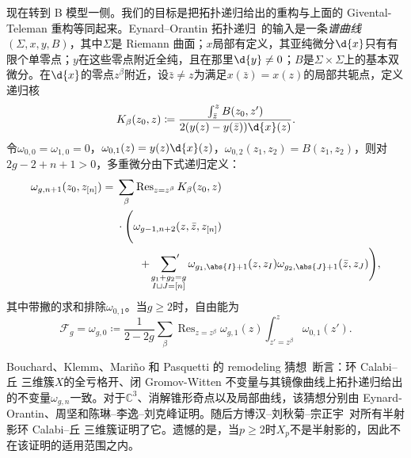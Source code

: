 \documentclass{amsart}
\theoremstyle{definition}
\theoremstyle{remark}
\theoremstyle{plain}
\theoremstyle{definition}
\theoremstyle{remark}
\newcommand{\C}{\mathbb{C}}
\newcommand{\mc}[1]{\mathcal{#1}}
\newcommand{\on}[1]{\operatorname{#1}}
\newcommand{\1}{\mathbf{1}}
\newcommand{\2}{\mathbf{2}}
\newcommand{\3}{\mathbf{3}}
\begin{document}
现在转到 B 模型一侧。我们的目标是把拓扑递归给出的重构与上面的 Givental-Teleman 重构等同起来。Eynard--Orantin 拓扑递归~\cite{EO2007}的输入是一条\textit{谱曲线}\((\Sigma,x,y,B)\)，其中\(\Sigma\)是 Riemann 曲面；\(x\)局部有定义，其亚纯微分\(\d{x}\)只有有限个单零点；\(y\)在这些零点附近全纯，且在那里\(\d{y} \neq 0\)；\(B\)是\(\Sigma \times \Sigma\)上的基本双微分。在\(\d{x}\)的零点\(z^{\beta}\)附近，设\(\bar{z} \neq z\)为满足\(x(\bar{z}) = x(z)\)的局部共轭点，定义递归核
\[ K_{\beta}(z_0,z) \coloneqq \frac{\int_{\bar{z}}^z B(z_0,z')}{2(y(z)-y(\bar{z}))\d{x}(z)}. \]
令\(\omega_{0,0} = \omega_{1,0} = 0\)，\(\omega_{0,1}(z) = y(z)\d{x}(z)\)，\(\omega_{0,2}(z_1,z_2) = B(z_1,z_2)\)，则对\(2g-2+n+1 > 0\)，多重微分由下式递归定义：
\begin{align*}
    \omega_{g,n+1}(z_0,z_{[n]}) ={}& \sum_{\beta}\on{Res}_{z = z^{\beta}} K_{\beta}(z_0,z) \\
    &\cdot \Bigg( \omega_{g-1,n+2}(z,\bar{z},z_{[n]}) \\
    &\qquad + \sideset{}{'}\sum_{\substack{g_1+g_2 = g \\ I \sqcup J = [n]}}\omega_{g_1,\abs{I}+1}(z,z_I)\omega_{g_2,\abs{J}+1}(\bar{z},z_J)\Bigg),
\end{align*}
其中带撇的求和排除\(\omega_{0,1}\)。当\(g \geq 2\)时，自由能为
\[ \mc{F}_g = \omega_{g,0} \coloneqq \frac{1}{2-2g}\sum_{\beta}\on{Res}_{z=z^{\beta}}\omega_{g,1}(z)\int_{z'=z^{\beta}}^z \omega_{0,1}(z'). \]

Bouchard、Klemm、Mari\~{n}o 和 Pasquetti 的 remodeling 猜想~\cite{BKMP2009}断言：环 Calabi--丘 三维簇\(X\)的全亏格开、闭 Gromov-Witten 不变量与其镜像曲线上拓扑递归给出的不变量\(\omega_{g,n}\)一致。对于\(\C^3\)、消解锥形奇点以及局部曲线，该猜想分别由 Eynard-Orantin、周坚和陈琳--李逸--刘克峰证明。随后方博汉--刘秋菊--宗正宇~\cite{FLZ2020}对所有半射影环 Calabi--丘 三维簇证明了它。遗憾的是，当\(p \geq 2\)时\(X_p\)不是半射影的，因此不在该证明的适用范围之内。
\end{document}
